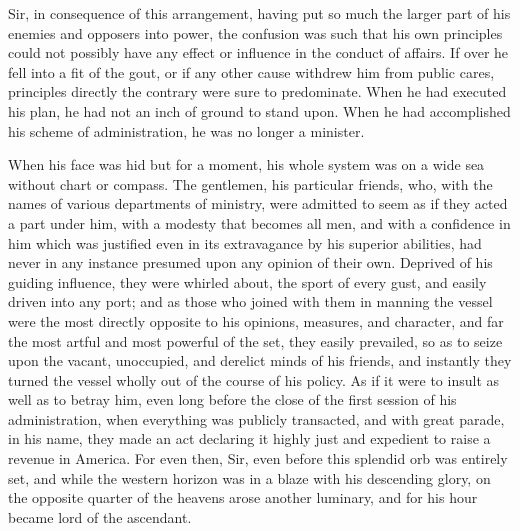 Sir, in consequence of this arrangement, having put so much the larger part of his enemies and opposers into power, the confusion was such that his own principles could not possibly have any effect or influence in the conduct of affairs. If over he fell into a fit of the gout, or if any other cause withdrew him from public cares, principles directly the contrary were sure to predominate. When he had executed his plan, he had not an inch of ground to stand upon. When he had accomplished his scheme of administration, he was no longer a minister.

When his face was hid but for a moment, his whole system was on a wide sea without chart or compass. The gentlemen, his particular friends, who, with the names of various departments of ministry, were admitted to seem as if they acted a part under him, with a modesty that becomes all men, and with a confidence in him which was justified even in its extravagance by his superior abilities, had never in any instance presumed upon any opinion of their own. Deprived of his guiding influence, they were whirled about, the sport of every gust, and easily driven into any port; and as those who joined with them in manning the vessel were the most directly opposite to his opinions, measures, and character, and far the most artful and most powerful of the set, they easily prevailed, so as to seize upon the vacant, unoccupied, and derelict minds of his friends, and instantly they turned the vessel wholly out of the course of his policy. As if it were to insult as well as to betray him, even long before the close of the first session of his administration, when everything was publicly transacted, and with great parade, in his name, they made an act declaring it highly just and expedient to raise a revenue in America. For even then, Sir, even before this splendid orb was entirely set, and while the western horizon was in a blaze with his descending glory, on the opposite quarter of the heavens arose another luminary, and for his hour became lord of the ascendant.

